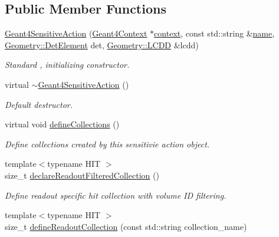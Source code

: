 \subsection*{Public Member Functions}
\begin{DoxyCompactItemize}
\item 
\hyperlink{class_d_d4hep_1_1_simulation_1_1_geant4_sensitive_action_ae1ede070242c666b523a1bb28a19a8f5}{Geant4\+Sensitive\+Action} (\hyperlink{class_d_d4hep_1_1_simulation_1_1_geant4_context}{Geant4\+Context} $\ast$\hyperlink{class_d_d4hep_1_1_simulation_1_1_geant4_action_aa9d87f0ec2a72b7fc2591b18f98d75cf}{context}, const std\+::string \&\hyperlink{class_d_d4hep_1_1_simulation_1_1_geant4_action_af374e70b014d16afb81dd9d77cc3894b}{name}, \hyperlink{class_d_d4hep_1_1_geometry_1_1_det_element}{Geometry\+::\+Det\+Element} det, \hyperlink{class_d_d4hep_1_1_geometry_1_1_l_c_d_d}{Geometry\+::\+L\+C\+DD} \&lcdd)
\begin{DoxyCompactList}\small\item\em Standard , initializing constructor. \end{DoxyCompactList}\item 
virtual \hyperlink{class_d_d4hep_1_1_simulation_1_1_geant4_sensitive_action_a2f233b92d70c7303055662c753063c7f}{$\sim$\+Geant4\+Sensitive\+Action} ()
\begin{DoxyCompactList}\small\item\em Default destructor. \end{DoxyCompactList}\item 
virtual void \hyperlink{class_d_d4hep_1_1_simulation_1_1_geant4_sensitive_action_a103768b61e0f22768de9a91ce588a88c}{define\+Collections} ()
\begin{DoxyCompactList}\small\item\em Define collections created by this sensitivie action object. \end{DoxyCompactList}\item 
{\footnotesize template$<$typename H\+IT $>$ }\\size\+\_\+t \hyperlink{class_d_d4hep_1_1_simulation_1_1_geant4_sensitive_action_a8eba94d693db1402e48eec8a7522a235}{declare\+Readout\+Filtered\+Collection} ()
\begin{DoxyCompactList}\small\item\em Define readout specific hit collection with volume ID filtering. \end{DoxyCompactList}\item 
{\footnotesize template$<$typename H\+IT $>$ }\\size\+\_\+t \hyperlink{class_d_d4hep_1_1_simulation_1_1_geant4_sensitive_action_abb78f83f4adb01a7dfa390ae4df33c2d}{define\+Readout\+Collection} (const std\+::string collection\+\_\+name)

\end{DoxyCompactItemize}
